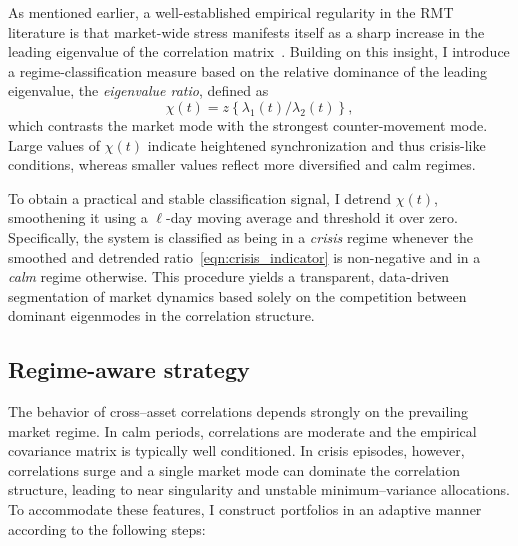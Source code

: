 \documentclass[pdflatex,sn-basic]{sn-jnl}%
\theoremstyle{thmstyleone}%
\theoremstyle{thmstyletwo}%
\theoremstyle{thmstylethree}%
\newcommand{\figbrc}[1]{\left\{ #1 \right\} }
\begin{document}
As mentioned earlier, a well-established empirical regularity in the RMT literature is that market-wide stress manifests itself as a sharp increase in the leading eigenvalue of the correlation matrix~\citep{laloux1999noise, plerou2002random}. Building on this insight, I introduce a regime-classification measure based on the relative dominance of the leading eigenvalue, the \textit{eigenvalue ratio}, defined as
\begin{equation}
\label{eqn:crisis_indicator}
    \chi(t) = z\figbrc{\lambda_{1}(t) / \lambda_{2}(t)},
\end{equation}
which contrasts the market mode with the strongest counter-movement mode. Large values of $\chi(t)$ indicate heightened synchronization and thus crisis-like conditions, whereas smaller values reflect more diversified and calm regimes. 

To obtain a practical and stable classification signal, I detrend $\chi(t)$, smoothening it using a $\ell$-day moving average and threshold it over zero. Specifically, the system is classified as being in a \textit{crisis} regime whenever the smoothed and detrended ratio~\eqref{eqn:crisis_indicator} is non-negative and in a \textit{calm} regime otherwise. This procedure yields a transparent, data-driven segmentation of market dynamics based solely on the competition between dominant eigenmodes in the correlation structure.

\subsection{Regime-aware strategy}
The behavior of cross--asset correlations depends strongly on the prevailing
market regime.  In calm periods, correlations are moderate and the empirical
covariance matrix is typically well conditioned.  In crisis episodes, however,
correlations surge and a single market mode can dominate the correlation
structure, leading to near singularity and unstable minimum--variance
allocations.  To accommodate these features, I construct portfolios in an
adaptive manner according to the following steps:
\end{document}
